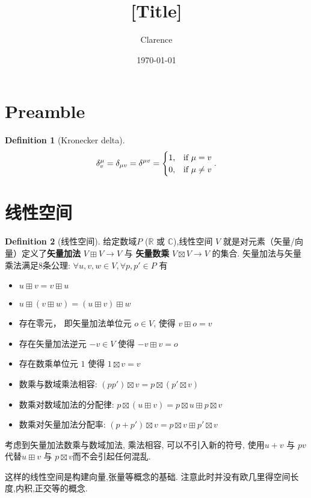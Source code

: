 \documentclass[UTF8]{ctexart}
\title{[Title]}
\date{\today}
\author{Clarence}
\theoremstyle{definition}
\newtheorem{definition}{Definition}[section]
\begin{document}
\maketitle
\newpage
\tableofcontents

\section{Preamble}
\begin{definition}[Kronecker delta]
  \[
    \delta ^\mu_v = \delta_{\mu v} = \delta^{\mu v} =
    \begin{cases}
    1, & \text{if $ \mu = v $} \\
    0, & \text{if $ \mu \neq v $}
    \end{cases}
  .\]
\end{definition}

\section{线性空间}

\begin{definition}[线性空间]
  给定数域$ P $ ($ \mathbb{R} $ 或 $ \mathbb{C} $),线性空间 $ V $ 就是对元素（矢量/向量）定义了\textbf{矢量加法} $ V \boxplus V \to V $ 与 \textbf{矢量数乘} $ V \boxtimes V \to V $ 的集合.
  矢量加法与矢量乘法满足8条公理:
    $ \forall u, v, w \in V, \forall p, p' \in P $ 有
  \begin{itemize}
    \item $ u\boxplus v = v \boxplus u $
    \item $ u \boxplus (v \boxplus w ) = (u \boxplus v) \boxplus w$
    \item 存在零元， 即矢量加法单位元 $ o \in V $, 使得 $ v \boxplus o = v $
    \item 存在矢量加法逆元 $ -v \in V $ 使得 $ -v \boxplus v = o $
    \item 存在数乘单位元 $ 1 $ 使得 $ 1 \boxtimes v = v $
    \item 数乘与数域乘法相容:
      $ (p p')\boxtimes v = p \boxtimes (p' \boxtimes v) $
    \item 数乘对数域加法的分配律:
      $ p \boxtimes ( u \boxplus v)= p \boxtimes u \boxplus p \boxtimes v $
    \item 数乘对矢量加法分配率:
      $ (p+p') \boxtimes v = p \boxtimes v \boxplus p' \boxtimes v $
  \end{itemize}
  考虑到矢量加法数乘与数域加法, 乘法相容, 可以不引入新的符号, 使用$ u + v $ 与 $ pv $ 代替$ u \boxplus v $ 与 $ p \boxtimes v $而不会引起任何混乱.
\end{definition}
这样的线性空间是构建向量,张量等概念的基础. 注意此时并没有欧几里得空间长度,内积,正交等的概念.
\end{document}
